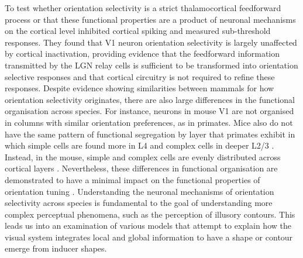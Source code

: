 \documentclass[12pt]{article}
\begin{document}
\bigbreak
To test whether orientation selectivity is a strict thalamocortical feedforward process or that these functional properties are a product of neuronal mechanisms on the cortical level \textcite{fersterOrientationSelectivityThalamic1996} inhibited cortical spiking and measured sub-threshold responses. They found that V1 neuron orientation selectivity is largely unaffected by cortical inactivation, providing evidence that the feedforward information transmitted by the LGN relay cells is sufficient to be transformed into orientation selective responses and that cortical circuitry is not required to refine these responses. Despite evidence showing similarities between mammals for how orientation selectivity originates, there are also large differences in the functional organisation across species. For instance, neurons in mouse V1 are not organised in columns with similar orientation preferences, as in primates. Mice also do not have the same pattern of functional segregation by layer that primates exhibit in which simple cells are found more in L4 and complex cells in deeper L2/3 \autocite{martinezReceptiveFieldStructure2005}. Instead, in the mouse, simple and complex cells are evenly distributed across cortical layers \autocite{niellHighlySelectiveReceptive2008}. Nevertheless, these differences in functional organisation are demonstrated to have a minimal impact on the functional properties of orientation tuning \autocite{hooserOrientationSelectivityOrientation2005}. Understanding the neuronal mechanisms of orientation selectivity across species is fundamental to the goal of understanding more complex perceptual phenomena, such as the perception of illusory contours. This leads us into an examination of various models that attempt to explain how the visual system integrates local and global information to have a shape or contour emerge from inducer shapes.
\bigbreak
\end{document}
